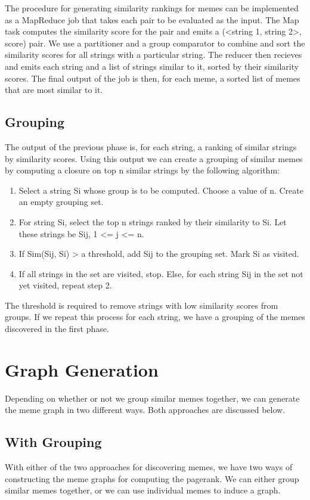 \documentclass{acm_proc_article-sp}
\begin{document}
The procedure for generating similarity rankings for memes can be implemented as a MapReduce job that takes each pair to be evaluated as the input. The Map task computes the similarity score for the pair and emits a (<string 1, string 2>, score) pair. We use a partitioner and a group comparator to combine and sort the similarity scores for all strings with a particular string. The reducer then recieves and emits each string and a list of strings similar to it, sorted by their similarity scores. The final output of the job is then, for each meme, a sorted list of memes that are most similar to it.

\subsection{Grouping}
The output of the previous phase is, for each string, a ranking of similar strings by similarity scores. Using this output we can create a grouping of similar memes by computing a closure on top n similar strings by the following algorithm:
\begin{enumerate}
\item Select a string Si whose group is to be computed. Choose a value of n. Create an empty grouping set.
\item For string Si, select the top n strings ranked by their similarity to Si. Let these strings be Sij, 1 <= j <= n. 
\item If Sim(Sij, Si) > a threshold, add Sij to the grouping set. Mark Si as visited.
\item If all strings in the set are visited, stop. Else, for each string Sij in the set not yet visited, repeat step 2.
\end{enumerate}

The threshold is required to remove strings with low similarity scores from groups. If we repeat this process for each string, we have a grouping of the memes discovered in the first phase.

\section{Graph Generation}
Depending on whether or not we group similar memes together, we can generate the meme graph in two different ways. Both approaches are discussed below. 

\subsection{With Grouping}
With either of the two approaches for discovering memes, we have two ways of constructing the meme graphs for computing the pagerank. We can either group similar memes together, or we can use individual memes to induce a graph. 
\end{document}
